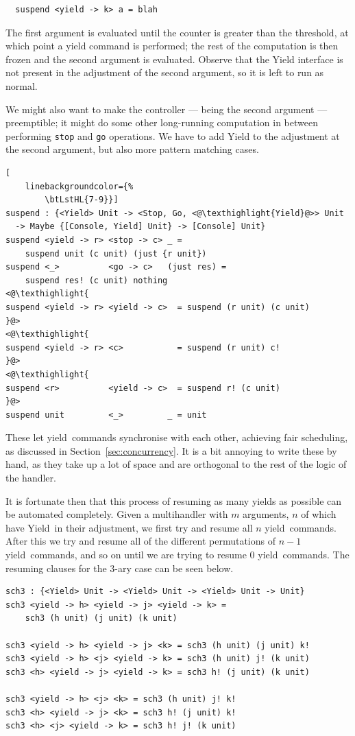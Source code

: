 \documentclass[msc,deptreport,cs]{infthesis} %
\newcommand{\code}[1]{\lstinline{#1}}
\newcommand{\texthighlight}[1]{%
  \colorbox{red!20}{#1}}
\newcommand\yield{\textsf{yield}\xspace}
\newcommand\Yield{\textsf{Yield}\xspace}
\begin{document}
\begin{lstlisting}
  suspend <yield -> k> a = blah
\end{lstlisting}

The first argument is evaluated until the counter is greater than the threshold,
at which point a yield command is performed; the rest of the computation is then
frozen and the second argument is evaluated. Observe that the \Yield interface
is not present in the adjustment of the second argument, so it is left to run
as normal.

We might also want to make the controller --- being the second argument ---
preemptible; it might do some other long-running computation in between
performing \code{stop} and \code{go} operations. We have to add \Yield to the
adjustment at the second argument, but also more pattern matching cases.

\begin{lstlisting}[
    linebackgroundcolor={%
        \btLstHL{7-9}}]
suspend : {<Yield> Unit -> <Stop, Go, <@\texthighlight{Yield}@>> Unit
  -> Maybe {[Console, Yield] Unit} -> [Console] Unit}
suspend <yield -> r> <stop -> c> _ =
    suspend unit (c unit) (just {r unit})
suspend <_>          <go -> c>   (just res) =
    suspend res! (c unit) nothing
<@\texthighlight{
suspend <yield -> r> <yield -> c>  = suspend (r unit) (c unit)
}@>
<@\texthighlight{
suspend <yield -> r> <c>           = suspend (r unit) c!
}@>
<@\texthighlight{
suspend <r>          <yield -> c>  = suspend r! (c unit)
}@>
suspend unit         <_>         _ = unit
\end{lstlisting}

These let \yield~commands synchronise with each other, achieving fair scheduling,
as discussed in Section~\ref{sec:concurrency}. It is a bit annoying to write
these by hand, as they take up a lot of space and are orthogonal to the rest of
the logic of the handler.

It is fortunate then that this process of resuming as many yields as possible
can be automated completely. Given a multihandler with $m$ arguments, $n$ of
which have \Yield~in their adjustment, we first try and resume all $n$
\yield~commands. After this we try and resume all of the different permutations
of $n-1$ \yield~commands, and so on until we are trying to resume 0
\yield~commands. The resuming clauses for the 3-ary case can be seen below.

\begin{lstlisting}
sch3 : {<Yield> Unit -> <Yield> Unit -> <Yield> Unit -> Unit}
sch3 <yield -> h> <yield -> j> <yield -> k> =
    sch3 (h unit) (j unit) (k unit)

sch3 <yield -> h> <yield -> j> <k> = sch3 (h unit) (j unit) k!
sch3 <yield -> h> <j> <yield -> k> = sch3 (h unit) j! (k unit)
sch3 <h> <yield -> j> <yield -> k> = sch3 h! (j unit) (k unit)

sch3 <yield -> h> <j> <k> = sch3 (h unit) j! k!
sch3 <h> <yield -> j> <k> = sch3 h! (j unit) k!
sch3 <h> <j> <yield -> k> = sch3 h! j! (k unit)
\end{lstlisting}
\end{document}
